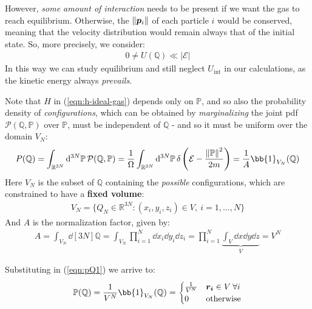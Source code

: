 \documentclass[../../main.tex]{subfiles}
\begin{document}
\medskip

However, \textit{some amount of interaction} needs to be present if we want the gas to reach equilibrium. Otherwise,  the $\norm{\bm{p}_i}$ of each particle $i$ would be conserved, meaning that the velocity distribution would remain always that of the initial state. So, more precisely, we consider:
\begin{align*}
    0 \neq U(\mathbb{Q}) \ll |\mathcal{E}|
\end{align*}  
In this way we can study equilibrium and still neglect $U_{\mathrm{int}}$ in our calculations, as the kinetic energy always \textit{prevails}. 

\medskip

Note that $H$ in (\ref{eqn:h-ideal-gas}) depends only on $\mathbb{P}$, and so also the probability density of \textit{configurations}, which can be obtained by \textit{marginalizing} the joint pdf $\mathcal{P}(\mathbb{Q},\mathbb{P})$ over $\mathbb{P}$, must be independent of $\mathbb{Q}$ - and so it must be uniform over the  domain $V_N$:
\begin{align}\label{eqn:pQ1}
    P(\mathbb{Q}) = \int_{\mathbb{R}^{3N}} \dd[3N]{\mathbb{P}} \mathcal{P}(\mathbb{Q},\mathbb{P}) = \frac{1}{\Omega} \int_{\mathbb{R}^{3N}} \dd[3N]{\mathbb{P}} \delta\left(\mathcal{E}- \frac{\norm{\mathbb{P}}^2}{2m} \right) = \frac{1}{A} \bb{1}_{V_N}(\mathbb{Q})
\end{align}
Here $V_N$ is the subset of $\mathbb{Q}$ containing the \textit{possible} configurations, which are constrained to have a \textbf{fixed volume}:
\begin{align*}
    V_N = \{Q_N \in \mathbb{R}^{3N} \colon (x_i, y_i, z_i) \in V, \> i = 1, \dots, N\}
\end{align*} 
And $A$ is the normalization factor, given by:
\begin{align}
    A = \int_{V_N} \dd[3N]{\mathbb{Q}} = \int_{V_N} \prod_{i=1}^{N} \dd{x_i}\dd{y_i}\dd{z_i} = \prod_{i=1}^N \underbrace{\int_V \dd{x}\dd{y}\dd{z}}_{V}  = V^N
\end{align}

Substituting in (\ref{eqn:pQ1}) we arrive to:
\begin{align} \label{eqn:pQ2}
    \mathbb{P}(\mathbb{Q}) = \frac{1}{V^N} \bb{1}_{V_N}(\mathbb{Q}) = \begin{cases}
        \frac{1}{V^N} & \bm{r_i} \in V \> \forall i\\
        0 & \text{otherwise} 
    \end{cases} 
\end{align}
\end{document}
